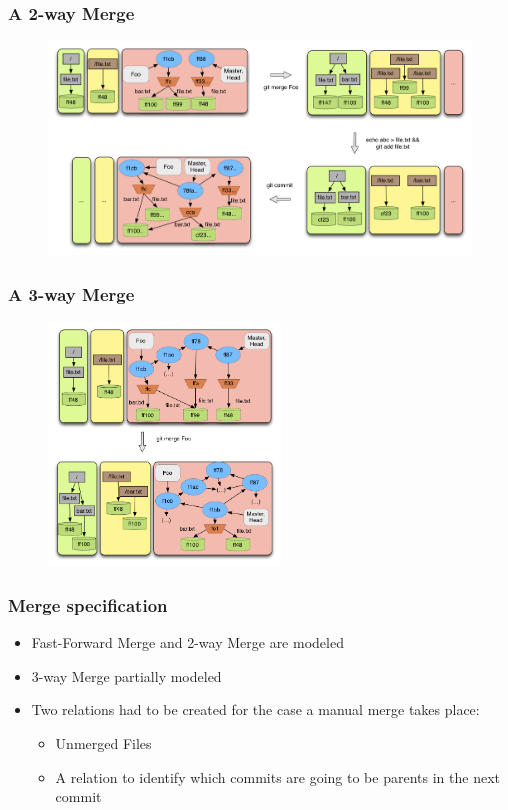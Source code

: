 \documentclass{beamer}
\begin{document}
\begin{frame}[fragile]
   \frametitle{A 2-way Merge}
   \begin{figure}
      \centering
      \includegraphics[width=1.0\textwidth]{images/merge2way.png}
   \end{figure}
\end{frame}

\begin{frame}[fragile]
   \frametitle{A 3-way Merge}
   \begin{figure}
      \centering
      \includegraphics[width=0.55\textwidth]{images/merge3way.png}
   \end{figure}
\end{frame}

\begin{frame}[fragile]
	\frametitle{Merge specification}
   \normalsize
	\begin{itemize}
      \item Fast-Forward Merge and 2-way Merge are modeled
	   \item 3-way Merge partially modeled
	   \item Two relations had to be created for the case a manual
      merge takes place:
	   \begin{itemize}
		   \item Unmerged Files
		   \item A relation to identify which commits are going to be
		   parents in the next commit 
	   \end{itemize}
	\end{itemize}
\end{frame}
\end{document}

